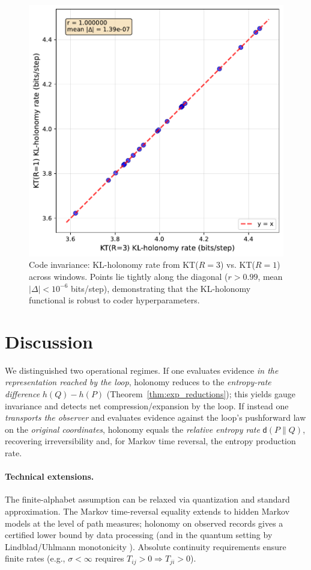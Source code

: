 \documentclass[11pt]{article}
\newcommand{\1}{\mathbbm{1}}
\begin{document}
\begin{figure}[h!]
  \centering
  \includegraphics[width=0.85\linewidth]{figures/code_invariance_scatter.pdf}
  \caption{Code invariance: KL-holonomy rate from KT($R=3$) vs. KT($R=1$) across windows. Points lie tightly along the diagonal ($r > 0.99$, mean $|\Delta| < 10^{-6}$ bits/step), demonstrating that the KL-holonomy functional is robust to coder hyperparameters.}
  \label{fig:code-invariance}
\end{figure}

\section*{Discussion}
We distinguished two operational regimes. If one evaluates evidence \emph{in the representation reached by the loop}, holonomy reduces to the \emph{entropy-rate difference} $h(Q)-h(P)$ (Theorem~\ref{thm:exp_reductions}); this yields gauge invariance and detects net compression/expansion by the loop. If instead one \emph{transports the observer} and evaluates evidence against the loop's pushforward law on the \emph{original coordinates}, holonomy equals the \emph{relative entropy rate} $\mathsf{d}(P\|Q)$, recovering irreversibility and, for Markov time reversal, the entropy production rate.

\paragraph{Technical extensions.} The finite-alphabet assumption can be relaxed via quantization and standard approximation. The Markov time-reversal equality extends to hidden Markov models at the level of path measures; holonomy on observed records gives a certified lower bound by data processing (and in the quantum setting by Lindblad/Uhlmann monotonicity \cite{lindblad1975,uhlmann1977}). Absolute continuity requirements ensure finite rates (e.g., $\sigma<\infty$ requires $T_{ij}>0 \Rightarrow T_{ji}>0$).
\end{document}
